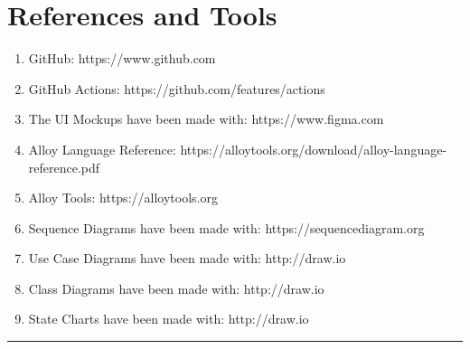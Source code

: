 \documentclass{Configuration_Files/Template}
\begin{document}
\section{References and Tools}

\begin{enumerate}
    \item GitHub: https://www.github.com
    \item GitHub Actions: https://github.com/features/actions
    \item The UI Mockups have been made with: https://www.figma.com
    \item Alloy Language Reference: https://alloytools.org/download/alloy-language-reference.pdf
    \item Alloy Tools: https://alloytools.org
    \item Sequence Diagrams have been made with: https://sequencediagram.org
    \item Use Case Diagrams have been made with: http://draw.io
    \item Class Diagrams have been made with: http://draw.io
    \item State Charts have been made with: http://draw.io
\end{enumerate}

{\color{bluepoli}\rule{\linewidth}{0.1pt}}
\end{document}
